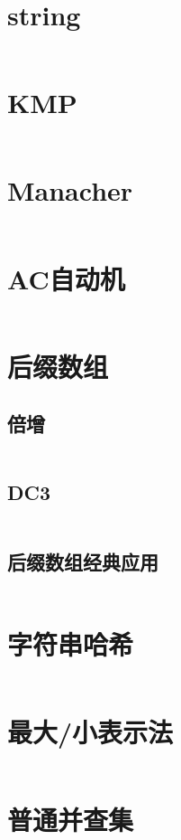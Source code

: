 \documentclass[a4paper,11pt]{article}
\begin{document}
\small

\newpage
\section*{string}
\inputminted[]{c++}{Template/String/STL.cpp}
\section*{KMP}
\inputminted[]{c++}{Template/String/kmp.cpp}
\section*{Manacher}
\inputminted[]{c++}{Template/String/manacher.cpp}
\section*{AC自动机}
\inputminted[]{c++}{Template/String/acm.cpp}
\section*{后缀数组}
\subsection*{倍增}
\inputminted[]{c++}{Template/String/sa.cpp}
\subsection*{DC3}
\inputminted[]{c++}{Template/String/sa-dc3.cpp}
\subsection*{后缀数组经典应用}
\inputminted[]{c++}{Template/String/SA-usage.cpp}
\section*{字符串哈希}
\inputminted[]{c++}{Template/String/hash.cpp}
\section*{最大/小表示法}
\inputminted[]{c++}{Template/String/express.cpp}

\newpage
\section*{普通并查集}
\inputminted[]{c++}{Template/TreeGraph/UnionSetI.cpp}
\end{document}
